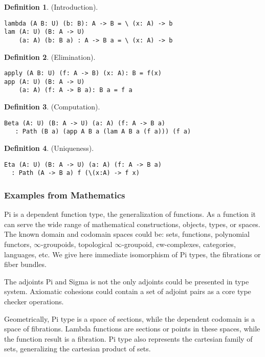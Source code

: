 \documentclass{article}
\theoremstyle{definition}
\newtheorem{definition}{Definition}
\begin{document}
\begin{definition} (Introduction).
\begin{lstlisting}
lambda (A B: U) (b: B): A -> B = \ (x: A) -> b
lam (A: U) (B: A -> U)
    (a: A) (b: B a) : A -> B a = \ (x: A) -> b
\end{lstlisting}
\end{definition}

\begin{definition} (Elimination).
\begin{lstlisting}
apply (A B: U) (f: A -> B) (x: A): B = f(x)
app (A: U) (B: A -> U)
    (a: A) (f: A -> B a): B a = f a
\end{lstlisting}
\end{definition}

\begin{definition} (Computation).
\begin{lstlisting}
Beta (A: U) (B: A -> U) (a: A) (f: A -> B a)
   : Path (B a) (app A B a (lam A B a (f a))) (f a)
\end{lstlisting}
\end{definition}

\begin{definition} (Uniqueness).
\begin{lstlisting}
Eta (A: U) (B: A -> U) (a: A) (f: A -> B a)
  : Path (A -> B a) f (\(x:A) -> f x)
\end{lstlisting}
\end{definition}

\subsubsection*{Examples from Mathematics}

Pi is a dependent function type, the generalization of functions.
As a function it can serve the wide range of mathematical constructions,
objects, types, or spaces. The known domain and codomain spaces could be:
sets, functions, polynomial functors, $\infty$-groupoids,
topological $\infty$-groupoid, cw-complexes,
categories, languages, etc. We give here immediate  isomorphism of Pi types,
the fibrations or fiber bundles.

The adjoints Pi and Sigma is not the only adjoints could be presented in type system.
Axiomatic cohesions could contain a set of adjoint pairs as a core type checker operations.

Geometrically, Pi type is a space of sections, while the dependent codomain is a space of fibrations.
Lambda functions are sections or points in these spaces, while the function result is a fibration.
Pi type also represents the cartesian family of sets, generalizing the cartesian product of sets.
\end{document}

